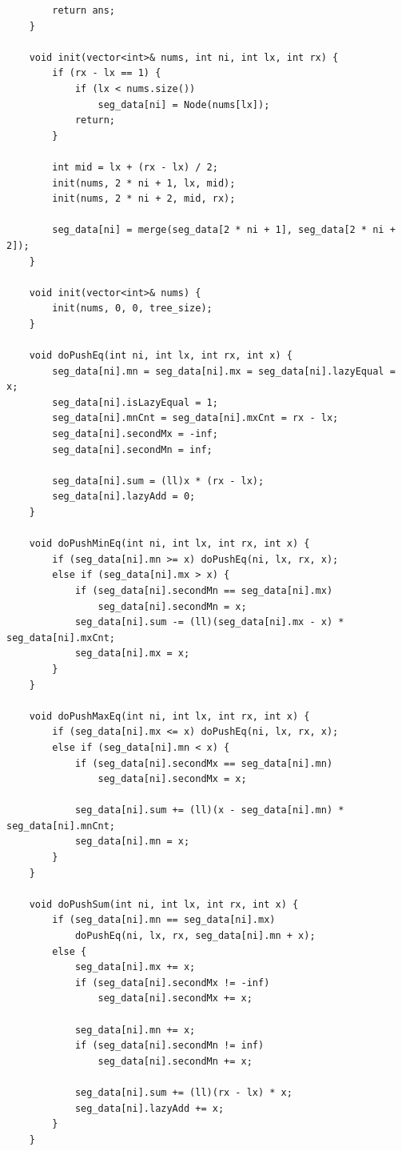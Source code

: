 \documentclass[9pt,a4paper,twocolumn]{extarticle}
\begin{document}
\begin{lstlisting}
        return ans;
    }

    void init(vector<int>& nums, int ni, int lx, int rx) {
        if (rx - lx == 1) {
            if (lx < nums.size())
                seg_data[ni] = Node(nums[lx]);
            return;
        }

        int mid = lx + (rx - lx) / 2;
        init(nums, 2 * ni + 1, lx, mid);
        init(nums, 2 * ni + 2, mid, rx);

        seg_data[ni] = merge(seg_data[2 * ni + 1], seg_data[2 * ni + 2]);
    }

    void init(vector<int>& nums) {
        init(nums, 0, 0, tree_size);
    }

    void doPushEq(int ni, int lx, int rx, int x) {
        seg_data[ni].mn = seg_data[ni].mx = seg_data[ni].lazyEqual = x;
        seg_data[ni].isLazyEqual = 1;
        seg_data[ni].mnCnt = seg_data[ni].mxCnt = rx - lx;
        seg_data[ni].secondMx = -inf;
        seg_data[ni].secondMn = inf;

        seg_data[ni].sum = (ll)x * (rx - lx);
        seg_data[ni].lazyAdd = 0;
    }

    void doPushMinEq(int ni, int lx, int rx, int x) {
        if (seg_data[ni].mn >= x) doPushEq(ni, lx, rx, x);
        else if (seg_data[ni].mx > x) {
            if (seg_data[ni].secondMn == seg_data[ni].mx)
                seg_data[ni].secondMn = x;
            seg_data[ni].sum -= (ll)(seg_data[ni].mx - x) * seg_data[ni].mxCnt;
            seg_data[ni].mx = x;
        }
    }

    void doPushMaxEq(int ni, int lx, int rx, int x) {
        if (seg_data[ni].mx <= x) doPushEq(ni, lx, rx, x);
        else if (seg_data[ni].mn < x) {
            if (seg_data[ni].secondMx == seg_data[ni].mn)
                seg_data[ni].secondMx = x;

            seg_data[ni].sum += (ll)(x - seg_data[ni].mn) * seg_data[ni].mnCnt;
            seg_data[ni].mn = x;
        }
    }

    void doPushSum(int ni, int lx, int rx, int x) {
        if (seg_data[ni].mn == seg_data[ni].mx)
            doPushEq(ni, lx, rx, seg_data[ni].mn + x);
        else {
            seg_data[ni].mx += x;
            if (seg_data[ni].secondMx != -inf)
                seg_data[ni].secondMx += x;

            seg_data[ni].mn += x;
            if (seg_data[ni].secondMn != inf)
                seg_data[ni].secondMn += x;

            seg_data[ni].sum += (ll)(rx - lx) * x;
            seg_data[ni].lazyAdd += x;
        }
    }


\end{lstlisting}
\end{document}
